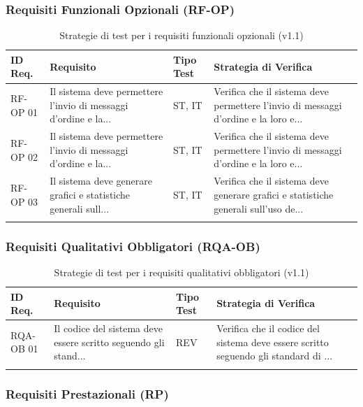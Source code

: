 \documentclass[a4paper,11pt,oneside]{scrartcl}
\begin{document}
\newpage
\subsubsection{Requisiti Funzionali Opzionali (RF-OP)}

\begin{longtable}{|p{1.5cm}|p{5.5cm}|p{1.8cm}|p{5cm}|}
\hline
\textbf{ID Req.} & \textbf{Requisito} & \textbf{Tipo Test} & \textbf{Strategia di Verifica} \\
\hline
RF-OP 01 & Il sistema deve permettere l'invio di messaggi d'ordine e la... & ST, IT & Verifica che il sistema deve permettere l'invio di messaggi d'ordine e la loro e... \\ \hline
RF-OP 02 & Il sistema deve permettere l'invio di messaggi d'ordine e la... & ST, IT & Verifica che il sistema deve permettere l'invio di messaggi d'ordine e la loro e... \\ \hline
RF-OP 03 & Il sistema deve generare grafici e statistiche generali sull... & ST, IT & Verifica che il sistema deve generare grafici e statistiche generali sull'uso de... \\ \hline
\caption{Strategie di test per i requisiti funzionali opzionali (v1.1)}
\end{longtable}

\newpage
\subsubsection{Requisiti Qualitativi Obbligatori (RQA-OB)}

\begin{longtable}{|p{1.5cm}|p{5.5cm}|p{1.8cm}|p{5cm}|}
\hline
\textbf{ID Req.} & \textbf{Requisito} & \textbf{Tipo Test} & \textbf{Strategia di Verifica} \\
\hline
RQA-OB 01 & Il codice del sistema deve essere scritto seguendo gli stand... & REV & Verifica che il codice del sistema deve essere scritto seguendo gli standard di ... \\ \hline
\caption{Strategie di test per i requisiti qualitativi obbligatori (v1.1)}
\end{longtable}

\newpage
\subsubsection{Requisiti Prestazionali (RP)}
\end{document}
